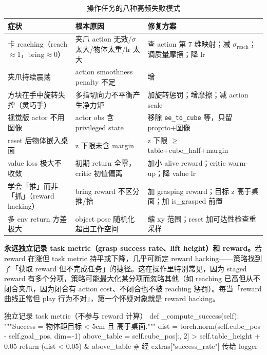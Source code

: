 \begin{table}[ht]
\centering
\small
\caption{操作任务的八种高频失败模式}
\label{tab:rlmc-manip-fail}
\begin{tabular}{@{}p{3.0cm}p{4.2cm}p{4.6cm}@{}}
\toprule
症状 & 根本原因 & 修复方案 \\
\midrule
卡 reaching（reach$\approx$1，bring$\approx$0） & 夹爪 action 无效/$\sigma$ 太大/物体太重/lr 太大 & 查 action 第 7 维映射；减 $\sigma_{\text{reach}}$；调质量摩擦；降 lr \\
夹爪持续震荡 & action smoothness penalty 不足 & 增 \Verb[breaklines]|action_rate_l2| 权重（0.01--0.05） \\
方块在手中旋转失控（灵巧手） & 多指切向力不平衡产生净力矩 & 加旋转惩罚；增摩擦；减 action scale \\
视觉版 actor 不用图像 & actor obs 含 privileged state & 移除 \verb|ee_to_cube| 等，只留 proprio+图像 \\
reset 后物体嵌入桌面 & z 下限未含 margin & z 下限 $\ge$ table+cube\_half+margin \\
value loss 极大不收敛 & 初期 return 全零，critic 初值偏离 & 加小 alive reward；critic warm-up；降 value lr \\
学会「推」而非「抓」（reward hacking） & bring reward 不区分推/抬 & 加 grasping reward；目标 z 高于桌面；加 is\_grasped 前置 \\
多 env return 方差极大 & object pose 随机化超出工作空间 & 缩 xy 范围；reset 加可达性检查重采样 \\
\bottomrule
\end{tabular}
\end{table}

\begin{insight}[黄金诊断原则：Reward Up, Task Metric Flat = Reward Hacking]\label{ins:rlmc-manip-hacking}
\textbf{永远独立记录 task metric（grasp success rate、lift height）和 reward。}若 reward 在涨但 task metric 持平或下降，几乎可断定 reward hacking——策略找到了「获取 reward 但不完成任务」的捷径。这在操作里特别常见，因为 staged reward 有多个分项，策略可能最大化某分项而忽略其他（如 reaching 已高但从不闭合夹爪，因为闭合有 action cost、不闭合也不被 reaching 惩罚）。每当「reward 曲线正常但 play 行为不对」，第一个怀疑对象就是 reward hacking。
\end{insight}

\begin{codebox}[Python]{独立记录 task metric（不参与 reward 计算）}
def _compute_success(self):
    """Success = 物体距目标 < 5cm 且 高于桌面."""
    dist = torch.norm(self.cube_pos - self.goal_pos, dim=-1)
    above_table = self.cube_pos[:, 2] > self.table_height + 0.05
    return (dist < 0.05) & above_table   # 经 extras["success_rate"] 传给 logger
\end{codebox}

